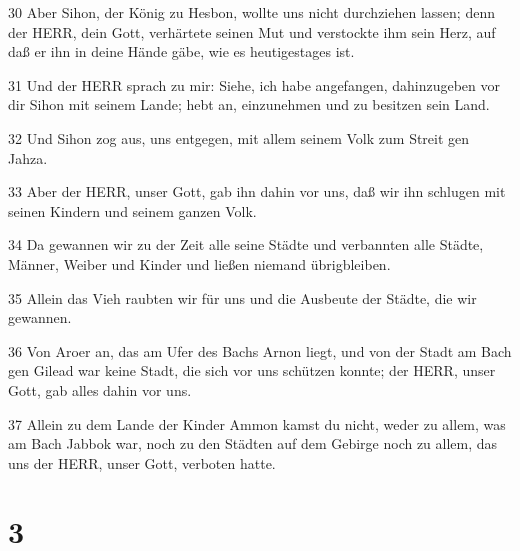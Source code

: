 \par 30 Aber Sihon, der König zu Hesbon, wollte uns nicht durchziehen lassen; denn der HERR, dein Gott, verhärtete seinen Mut und verstockte ihm sein Herz, auf daß er ihn in deine Hände gäbe, wie es heutigestages ist.
\par 31 Und der HERR sprach zu mir: Siehe, ich habe angefangen, dahinzugeben vor dir Sihon mit seinem Lande; hebt an, einzunehmen und zu besitzen sein Land.
\par 32 Und Sihon zog aus, uns entgegen, mit allem seinem Volk zum Streit gen Jahza.
\par 33 Aber der HERR, unser Gott, gab ihn dahin vor uns, daß wir ihn schlugen mit seinen Kindern und seinem ganzen Volk.
\par 34 Da gewannen wir zu der Zeit alle seine Städte und verbannten alle Städte, Männer, Weiber und Kinder und ließen niemand übrigbleiben.
\par 35 Allein das Vieh raubten wir für uns und die Ausbeute der Städte, die wir gewannen.
\par 36 Von Aroer an, das am Ufer des Bachs Arnon liegt, und von der Stadt am Bach gen Gilead war keine Stadt, die sich vor uns schützen konnte; der HERR, unser Gott, gab alles dahin vor uns.
\par 37 Allein zu dem Lande der Kinder Ammon kamst du nicht, weder zu allem, was am Bach Jabbok war, noch zu den Städten auf dem Gebirge noch zu allem, das uns der HERR, unser Gott, verboten hatte.

\chapter{3}

